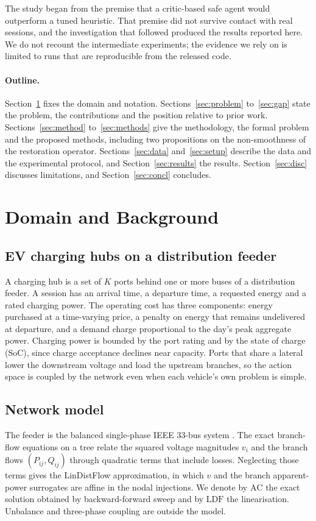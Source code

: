 \documentclass[11pt]{article}
\newcommand{\ldf}{\mathrm{LDF}}
\newcommand{\ac}{\mathrm{AC}}
\begin{document}
The study began from the premise that a critic-based safe agent would outperform a tuned heuristic. That premise did not survive contact with real sessions, and the investigation that followed produced the results reported here. We do not recount the intermediate experiments; the evidence we rely on is limited to runs that are reproducible from the released code.

\paragraph{Outline.} Section~\ref{sec:domain} fixes the domain and notation. Sections~\ref{sec:problem} to~\ref{sec:gap} state the problem, the contributions and the position relative to prior work. Sections~\ref{sec:method} to~\ref{sec:methods} give the methodology, the formal problem and the proposed methods, including two propositions on the non-smoothness of the restoration operator. Sections~\ref{sec:data} and~\ref{sec:setup} describe the data and the experimental protocol, and Section~\ref{sec:results} the results. Section~\ref{sec:disc} discusses limitations, and Section~\ref{sec:concl} concludes.

\section{Domain and Background}\label{sec:domain}
\subsection{EV charging hubs on a distribution feeder}
A charging hub is a set of $K$ ports behind one or more buses of a distribution feeder. A session has an arrival time, a departure time, a requested energy and a rated charging power. The operating cost has three components: energy purchased at a time-varying price, a penalty on energy that remains undelivered at departure, and a demand charge proportional to the day's peak aggregate power. Charging power is bounded by the port rating and by the state of charge (SoC), since charge acceptance declines near capacity. Ports that share a lateral lower the downstream voltage and load the upstream branches, so the action space is coupled by the network even when each vehicle's own problem is simple.

\subsection{Network model}
The feeder is the balanced single-phase IEEE 33-bus system \cite{baranwu}. The exact branch-flow equations on a tree \cite{farivar} relate the squared voltage magnitudes $v_i$ and the branch flows $(P_{ij},Q_{ij})$ through quadratic terms that include losses. Neglecting those terms gives the LinDistFlow approximation, in which $v$ and the branch apparent-power surrogates are affine in the nodal injections. We denote by $\ac$ the exact solution obtained by backward-forward sweep and by $\ldf$ the linearisation. Unbalance and three-phase coupling are outside the model.
\end{document}
